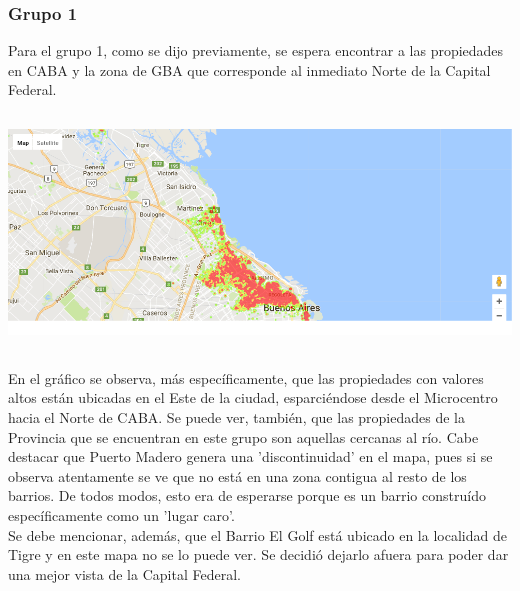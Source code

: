 \documentclass[a4paper, 10pt]{article}
\newcommand\tab[1][0.5cm]{\hspace*{#1}}
\begin{document}
				\subsubsection{Grupo 1}
					Para el grupo 1, como se dijo previamente, se espera encontrar a las propiedades en CABA y la zona de GBA
					que corresponde al inmediato Norte de la Capital Federal.
					\begin{center}
						\includegraphics[width=6in, height=2.46in]{images/m2Group1HeatMap}
				  	\end{center}
				  	\tab En el gráfico se observa, más específicamente, que las propiedades con valores altos están ubicadas
				  	en el Este de la ciudad, esparciéndose desde el Microcentro hacia el Norte de CABA. Se puede ver, también,
				  	que las propiedades de la Provincia que se encuentran en este grupo son aquellas cercanas al río. Cabe destacar
				  	que Puerto Madero genera una 'discontinuidad' en el mapa, pues si se observa atentamente se ve que no está en
				  	una zona contigua al resto de los barrios. De todos modos, esto era de esperarse porque es un barrio construído
				  	específicamente como un 'lugar caro'. \\
				  	\tab Se debe mencionar, además, que el Barrio El Golf está ubicado en la localidad de Tigre y en este mapa no
				  	se lo puede ver. Se decidió dejarlo afuera para poder dar una mejor vista de la Capital Federal.
\end{document}

